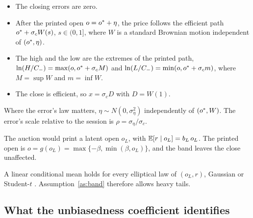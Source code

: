 \begin{assumption}\label{as:path}
\leavevmode
\begin{itemize}
  \item The closing errors are zero.
  \item After the printed open $o={o^{*}}+\eta$, the price follows the efficient path
        ${o^{*}}+\sigma_c W(s)$, $s\in(0,1]$, where $W$ is a standard Brownian motion independent of
        $({o^{*}},\eta)$.
  \item The high and the low are the extremes of the printed path,
        $\ln(H/C_{-})=\max(o,{o^{*}}+\sigma_c M)$ and $\ln(L/C_{-})=\min(o,{o^{*}}+\sigma_c m)$, where
        $M=\sup W$ and $m=\inf W$.
  \item The close is efficient, so $x=\sigma_c D$ with $D=W(1)$.
\end{itemize}
Where the error's law matters, $\eta\sim N(0,\sigma_\eta^2)$ independently of $({o^{*}},W)$. The
error's scale relative to the session is $\rho=\sigma_\eta/\sigma_c$.
\end{assumption}

\begin{assumption}\label{as:band}
The auction would print a latent open $o_L$, with $\mathbb{E}[r\mid o_L]=b_L\,o_L$. The printed open is
$o=g(o_L)=\max\{-\beta,\min(\beta,o_L)\}$, and the band leaves the close unaffected.
\end{assumption}

A linear conditional mean holds for every elliptical law of $(o_L,r)$, Gaussian or Student-$t$
\citep{CambanisHuangSimons1981}. Assumption~\ref{as:band} therefore allows heavy tails.

\subsection{What the unbiasedness coefficient identifies}\label{sec:identification}

